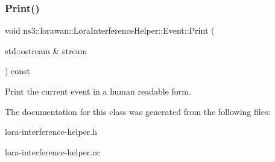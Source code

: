 \subsubsection{\texorpdfstring{Print()}{Print()}}
{\footnotesize\ttfamily void ns3\+::lorawan\+::\+Lora\+Interference\+Helper\+::\+Event\+::\+Print (\begin{DoxyParamCaption}\item[{std\+::ostream \&}]{stream }\end{DoxyParamCaption}) const}

Print the current event in a human readable form. 

The documentation for this class was generated from the following files\+:\begin{DoxyCompactItemize}
\item 
lora-\/interference-\/helper.\+h\item 
lora-\/interference-\/helper.\+cc\end{DoxyCompactItemize}
